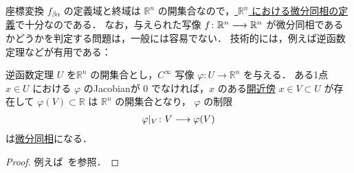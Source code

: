 \documentclass[geometry_main]{subfiles}
\begin{document}
座標変換 $f_{\beta\alpha}$ の定義域と終域は $\mathbb{R}^n$ の開集合なので，\hyperref[def.diffeomo]{ $\mathbb{R}^n$ における微分同相の定義}で十分なのである．
なお，与えられた写像 $f \colon \mathbb{R}^n \longrightarrow \mathbb{R}^n$ が微分同相であるかどうかを判定する問題は，一般には容易でない．
技術的には，例えば逆函数定理などが有用である：
\begin{mytheo}[label=thm.inverse]{逆函数定理}
	$U$ を$\mathbb{R}^n$ の開集合とし，$C^\infty$ 写像 $\varphi \colon U \to \mathbb{R}^n$ を与える．
	ある1点 $x \in U$ における $\varphi$ のJacobianが $0$ でなければ，$x$ のある\hyperref[def:neighborhood]{開近傍} $x \in V \subset U$ が存在して $\varphi(V) \subset \mathbb{R}$ は $\mathbb{R}^n$ の開集合となり，
	$\varphi$ の制限
	\begin{align}
		\varphi|_V \colon V \longrightarrow \varphi(V)
	\end{align}
	は\hyperref[def.diffeomo]{微分同相}になる．
\end{mytheo}

\begin{proof}
	例えば~\cite[Theorem C.34]{Lee12}を参照．
\end{proof}
\end{document}
